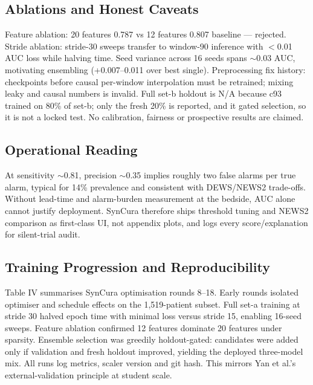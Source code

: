 \documentclass[a4paper,conference]{IEEEtran}
\begin{document}
\subsection{Ablations and Honest Caveats}
Feature ablation: 20 features 0.787 vs 12 features 0.807 baseline --- rejected. Stride ablation: stride-30 sweeps transfer to window-90 inference with $<$0.01 AUC loss while halving time. Seed variance across 16 seeds spans $\sim$0.03 AUC, motivating ensembling (+0.007--0.011 over best single). Preprocessing fix history: checkpoints before causal per-window interpolation must be retrained; mixing leaky and causal numbers is invalid. Full set-b holdout is N/A because c93 trained on 80\% of set-b; only the fresh 20\% is reported, and it gated selection, so it is not a locked test. No calibration, fairness or prospective results are claimed.

\subsection{Operational Reading}
At sensitivity $\sim$0.81, precision $\sim$0.35 implies roughly two false alarms per true alarm, typical for 14\% prevalence and consistent with DEWS/NEWS2 trade-offs. Without lead-time and alarm-burden measurement at the bedside, AUC alone cannot justify deployment. SynCura therefore ships threshold tuning and NEWS2 comparison as first-class UI, not appendix plots, and logs every score/explanation for silent-trial audit.

\subsection{Training Progression and Reproducibility}
Table IV summarises SynCura optimisation rounds 8--18. Early rounds isolated optimiser and schedule effects on the 1,519-patient subset. Full set-a training at stride 30 halved epoch time with minimal loss versus stride 15, enabling 16-seed sweeps. Feature ablation confirmed 12 features dominate 20 features under sparsity. Ensemble selection was greedily holdout-gated: candidates were added only if validation and fresh holdout improved, yielding the deployed three-model mix. All runs log metrics, scaler version and git hash. This mirrors Yan et al.'s external-validation principle at student scale.
\end{document}

